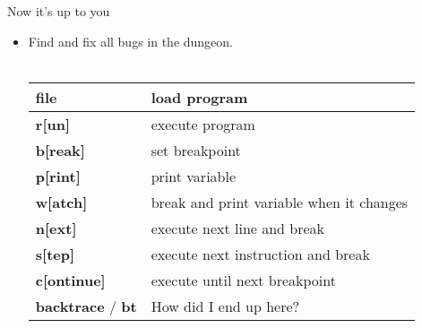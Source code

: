 \begin{frame}{Now it's up to you}
	\begin{itemize}
		\item Find and fix all bugs in the dungeon.\\\ \\
		\begin{tabular}{|l|l|}
			\hline
			\textbf{file} & load program\\\hline
			\textbf{r[un]} & execute program\\\hline
			\textbf{b[reak]} & set breakpoint\\\hline
			\textbf{p[rint]} & print variable\\\hline
			\textbf{w[atch]} & break and print variable when it changes\\\hline
			\textbf{n[ext]} & execute next line and break\\\hline
			\textbf{s[tep]} & execute next instruction and break\\\hline
			\textbf{c[ontinue]} & execute until next breakpoint\\\hline
			\textbf{backtrace} / \textbf{bt} & How did I end up here?\\\hline
		\end{tabular}
	\end{itemize}
\end{frame}


